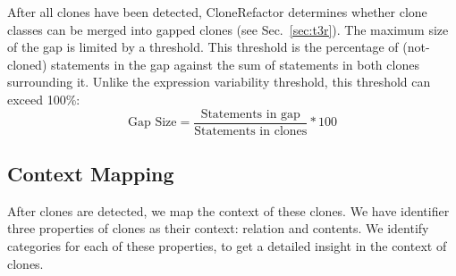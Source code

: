 \documentclass[sigconf,review]{acmart}
\begin{document}
After all clones have been detected, CloneRefactor determines whether clone classes can be merged into gapped clones (see Sec.~\ref{sec:t3r}). The maximum size of the gap is limited by a threshold. This threshold is the percentage of (not-cloned) statements in the gap against the sum of statements in both clones surrounding it. Unlike the expression variability threshold, this threshold can exceed 100\%:
\begin{equation}\label{eq:type3r}
\text{Gap Size}=\frac{\text{Statements in gap}}{\text{Statements in clones}}*100
\end{equation}

\subsection{Context Mapping}
After clones are detected, we map the context of these clones. We have identifier three properties of clones as their context: relation and contents. We identify categories for each of these properties, to get a detailed insight in the context of clones.
\end{document}
